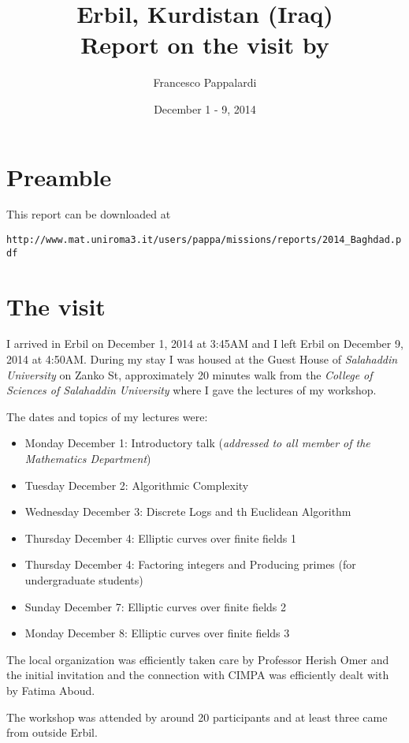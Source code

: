 \documentclass[12pt,a4paper]{scrartcl}
\title{Erbil, Kurdistan (Iraq)\\ Report on the visit by}
\author{Francesco Pappalardi}
\date{December 1 - 9, 2014}
\begin{document}
\maketitle


\section{Preamble}

This report can be downloaded at

\texttt{http://www.mat.uniroma3.it/users/pappa/missions/reports/2014\_Baghdad.pdf}


\section{The visit}

I arrived in Erbil on December 1, 2014 at 3:45AM and I left Erbil on December 9, 2014 at 4:50AM. During my stay I was housed 
at the Guest House of \emph{Salahaddin University} on Zanko St, approximately 20 minutes walk from the \emph{College of Sciences of Salahaddin
University} where I gave the lectures of my workshop.

The dates and topics of my lectures were:
\begin{itemize}
 \item Monday December 1: Introductory talk (\textit{addressed to all member of the Mathematics Department})
 \item Tuesday December 2: Algorithmic Complexity 
 \item Wednesday December 3: Discrete Logs and th Euclidean Algorithm
 \item Thursday December 4: Elliptic curves over finite fields 1
 \item Thursday December 4: Factoring integers and Producing primes (for undergraduate students)
 \item Sunday December 7: Elliptic curves over finite fields 2
 \item Monday December 8: Elliptic curves over finite fields 3
\end{itemize}

The local organization was efficiently taken care by Professor Herish Omer and the initial invitation and the connection with
CIMPA was efficiently dealt with by Fatima Aboud.

The workshop was attended by around 20 participants and at least three came from outside Erbil.
\end{document}
